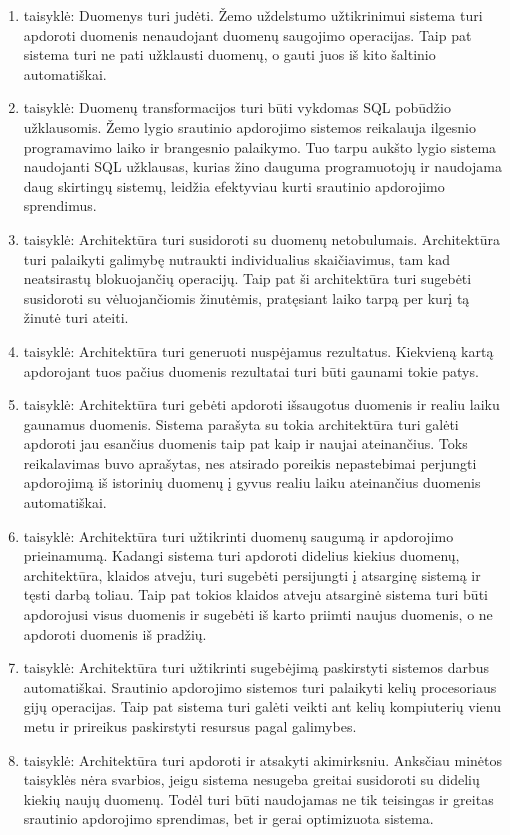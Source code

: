 \documentclass{VUMIFPSkursinis}
\begin{document}
\begin{enumerate}[label=\arabic*]
    \item taisyklė: Duomenys turi judėti. Žemo uždelstumo užtikrinimui sistema turi apdoroti duomenis nenaudojant duomenų saugojimo operacijas. Taip pat sistema turi ne pati užklausti duomenų, o gauti juos
    iš kito šaltinio automatiškai. 
    \item taisyklė: Duomenų transformacijos turi būti vykdomas SQL pobūdžio užklausomis. Žemo lygio srautinio apdorojimo sistemos reikalauja ilgesnio programavimo laiko ir brangesnio palaikymo. Tuo tarpu aukšto lygio sistema 
    naudojanti SQL užklausas, kurias žino dauguma programuotojų ir naudojama daug skirtingų sistemų, leidžia efektyviau kurti srautinio apdorojimo sprendimus.
    \item taisyklė: Architektūra turi susidoroti su duomenų netobulumais. Architektūra turi palaikyti galimybę nutraukti individualius skaičiavimus, tam kad neatsirastų blokuojančių operacijų. Taip pat ši 
    architektūra turi sugebėti susidoroti su vėluojančiomis žinutėmis, pratęsiant laiko tarpą per kurį tą žinutė turi ateiti.
    \item taisyklė: Architektūra turi generuoti nuspėjamus rezultatus. Kiekvieną kartą apdorojant tuos pačius duomenis rezultatai turi būti gaunami tokie patys.
    \item taisyklė: Architektūra turi gebėti apdoroti išsaugotus duomenis ir realiu laiku gaunamus duomenis. Sistema parašyta su tokia architektūra turi galėti apdoroti jau esančius duomenis taip pat kaip ir 
    naujai ateinančius. Toks reikalavimas buvo aprašytas, nes atsirado poreikis nepastebimai perjungti apdorojimą iš istorinių duomenų į gyvus realiu laiku ateinančius duomenis automatiškai.
    \item taisyklė: Architektūra turi užtikrinti duomenų saugumą ir apdorojimo prieinamumą. Kadangi sistema turi apdoroti didelius kiekius duomenų, architektūra, klaidos atveju, turi sugebėti persijungti į atsarginę
    sistemą ir tęsti darbą toliau. Taip pat tokios klaidos atveju atsarginė sistema turi būti apdorojusi visus duomenis ir sugebėti iš karto priimti naujus duomenis, o ne apdoroti duomenis iš pradžių.
    \item taisyklė: Architektūra turi užtikrinti sugebėjimą paskirstyti sistemos darbus automatiškai. Srautinio apdorojimo sistemos turi palaikyti kelių procesoriaus gijų operacijas. Taip pat sistema turi galėti 
    veikti ant kelių kompiuterių vienu metu ir prireikus paskirstyti resursus pagal galimybes.
    \item taisyklė: Architektūra turi apdoroti ir atsakyti akimirksniu. Anksčiau minėtos taisyklės nėra svarbios, jeigu sistema nesugeba greitai susidoroti su didelių kiekių naujų duomenų. 
    Todėl turi būti naudojamas ne tik teisingas ir greitas srautinio apdorojimo sprendimas, bet ir gerai optimizuota sistema.
\end{enumerate}\par
\end{document}
